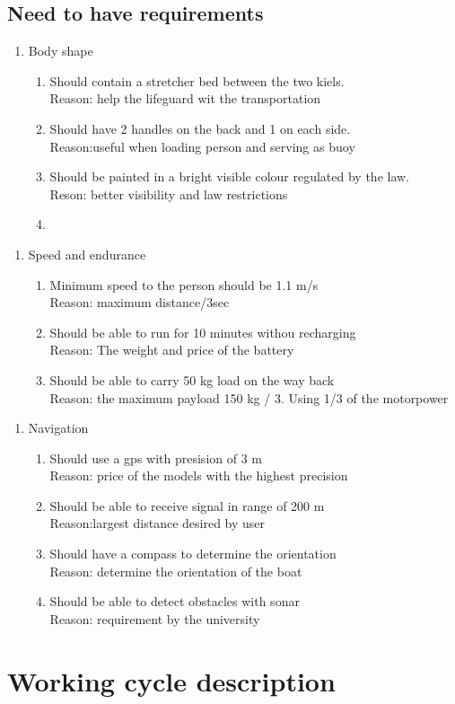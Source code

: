\subsection{Need to have requirements}
\begin {enumerate}
\item Body shape 
    \begin {enumerate}
    \item Should contain a stretcher bed between the two kiels. 
    \\Reason: help the lifeguard wit the transportation
    \item Should have 2 handles on the back and 1 on each side.
    \\Reason:useful when loading person and serving as buoy 
    \item Should be painted in a bright visible colour regulated by the law.
    \\Reson: better visibility and law restrictions
    \item 
    \end {enumerate}
\end {enumerate}
\begin {enumerate}
\item Speed and endurance 
    \begin {enumerate}
    \item Minimum speed to the person should be 1.1 m/s
    \\Reason: maximum distance/3sec
    \item Should be able to run for 10 minutes withou recharging
    \\Reason: The weight and price of the battery
    \item Should be able to carry 50 kg load on the way back
    \\ Reason: the maximum payload 150 kg / 3. Using 1/3 of the motorpower
    \end {enumerate}
\end {enumerate}
\begin {enumerate}
\item Navigation 
    \begin {enumerate}
    \item Should use a gps with presision of 3 m 
    \\Reason: price of the models with the highest precision
    \item Should be able to receive signal in range of 200 m
    \\Reason:largest distance desired by user
    \item Should have a compass to determine the orientation 
    \\Reason: determine the orientation of the boat
    \item Should be able to detect obstacles with sonar
    \\ Reason: requirement by the university
    \end {enumerate}
\end {enumerate}


\section{Working cycle description}


